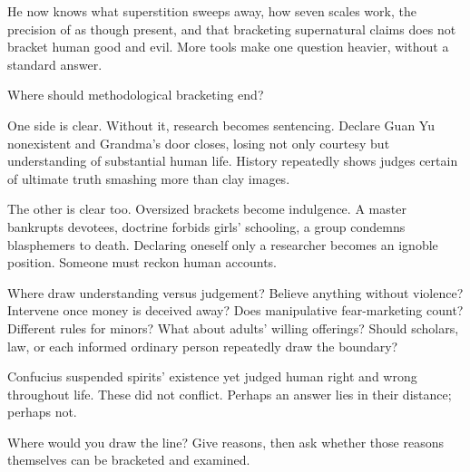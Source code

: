 He now knows what superstition sweeps away, how seven scales work, the precision of as though present, and that bracketing supernatural claims does not bracket human good and evil. More tools make one question heavier, without a standard answer.

Where should methodological bracketing end?

One side is clear. Without it, research becomes sentencing. Declare Guan Yu nonexistent and Grandma's door closes, losing not only courtesy but understanding of substantial human life. History repeatedly shows judges certain of ultimate truth smashing more than clay images.

The other is clear too. Oversized brackets become indulgence. A master bankrupts devotees, doctrine forbids girls' schooling, a group condemns blasphemers to death. Declaring oneself only a researcher becomes an ignoble position. Someone must reckon human accounts.

Where draw understanding versus judgement? Believe anything without violence? Intervene once money is deceived away? Does manipulative fear-marketing count? Different rules for minors? What about adults' willing offerings? Should scholars, law, or each informed ordinary person repeatedly draw the boundary?

Confucius suspended spirits' existence yet judged human right and wrong throughout life. These did not conflict. Perhaps an answer lies in their distance; perhaps not.

Where would you draw the line? Give reasons, then ask whether those reasons themselves can be bracketed and examined.
